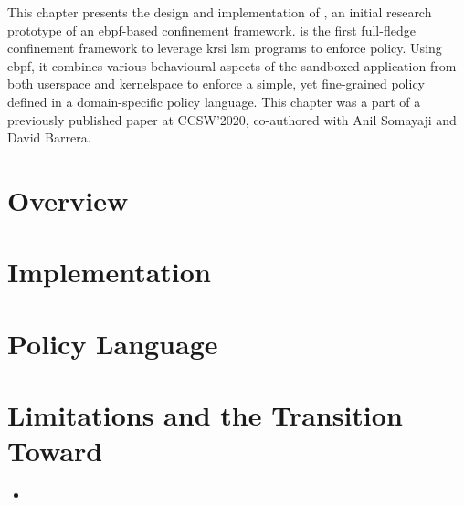 This chapter presents the design and implementation of \bpfbox{}, an initial research
prototype of an \gls{ebpf}-based confinement framework. \bpfbox{} is the first full-fledge
confinement framework to leverage \gls{krsi} \gls{lsm} programs to enforce policy. Using
\gls{ebpf}, it combines various behavioural aspects of the sandboxed application from both
userspace and kernelspace to enforce a simple, yet fine-grained policy defined in
a domain-specific policy language. This chapter was a part of a previously published paper
at CCSW'2020, co-authored with Anil Somayaji and David Barrera.




\section{\bpfbox{} Overview}




\section{\bpfbox{} Implementation}





\section{\bpfbox{} Policy Language}






\section{Limitations and the Transition Toward \bpfcontain{}}


\begin{inprogress}
\begin{itemize}
  \item
\end{itemize}
\end{inprogress}
